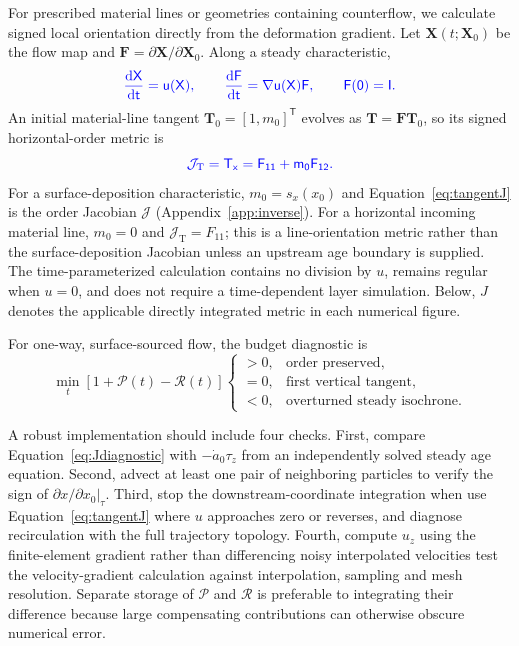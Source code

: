 \documentclass[review]{igs}
\providecommand{\DIFadd}[1]{{\protect\color{blue} \sf #1}} %
\providecommand{\DIFdel}[1]{{\protect\color{red} \scriptsize #1}} %
\providecommand{\DIFaddbegin}{} %
\providecommand{\DIFaddend}{} %
\providecommand{\DIFdelbegin}{} %
\providecommand{\DIFdelend}{} %
\newcommand{\DIFscaledelfig}{0.5}
\newlength{\DIFdelgraphicswidth} %
\newlength{\DIFdelgraphicsheight} %
\newcommand{\DIFaddincludegraphics}[2][]{{\color{blue}\fbox{\DIFOincludegraphics[#1]{#2}}}} %
\newcommand{\DIFdelincludegraphics}[2][]{%
\sbox{\DIFdelgraphicsbox}{\DIFOincludegraphics[#1]{#2}}%
\settoboxwidth{\DIFdelgraphicswidth}{\DIFdelgraphicsbox} %
\settoboxtotalheight{\DIFdelgraphicsheight}{\DIFdelgraphicsbox} %
\scalebox{\DIFscaledelfig}{%
\parbox[b]{\DIFdelgraphicswidth}{\usebox{\DIFdelgraphicsbox}\\[-\baselineskip] \rule{\DIFdelgraphicswidth}{0em}}\llap{\resizebox{\DIFdelgraphicswidth}{\DIFdelgraphicsheight}{%
\setlength{\unitlength}{\DIFdelgraphicswidth}%
\begin{picture}(1,1)%
\thicklines\linethickness{2pt} %
{\color[rgb]{1,0,0}\put(0,0){\framebox(1,1){}}}%
{\color[rgb]{1,0,0}\put(0,0){\line( 1,1){1}}}%
{\color[rgb]{1,0,0}\put(0,1){\line(1,-1){1}}}%
\end{picture}%
}\hspace*{3pt}}} %
} %
\DeclareRobustCommand{\DIFaddbegin}{\DIFOaddbegin \let\includegraphics\DIFaddincludegraphics} %
\DeclareRobustCommand{\DIFaddend}{\DIFOaddend \let\includegraphics\DIFOincludegraphics} %
\DeclareRobustCommand{\DIFdelbegin}{\DIFOdelbegin \let\includegraphics\DIFdelincludegraphics} %
\DeclareRobustCommand{\DIFdelend}{\DIFOaddend \let\includegraphics\DIFOincludegraphics} %
\begin{document}
\DIFadd{For prescribed material lines or geometries containing counterflow, we calculate signed local orientation directly from the deformation gradient. Let \(\bm{X}(t;\bm{X}_0)\) be the flow map and \(\bm{F}=\partial\bm{X}/\partial\bm{X}_0\). Along a steady characteristic,
}\begin{equation}
\DIFadd{\frac{\mathop{}\!\mathrm{d}\bm{X}}{\mathop{}\!\mathrm{d}t}=\bm{u}(\bm{X}),
\qquad
\frac{\mathop{}\!\mathrm{d}\bm{F}}{\mathop{}\!\mathrm{d}t}
=\nabla\bm{u}(\bm{X})\bm{F},
\qquad
\bm{F}(0)=\bm{I}.
\label{eq:deformationgradient}
}\end{equation}
\DIFadd{An initial material-line tangent \(\bm{T}_0=[1,m_0]^{\mathsf T}\) evolves as \(\bm{T}=\bm{F}\bm{T}_0\), so its signed horizontal-order metric is
}\begin{equation}
\DIFadd{\mathcal{J}_{\mathrm{T}}=T_x=F_{11}+m_0F_{12}.
\label{eq:tangentJ}
}\end{equation}
\DIFadd{For a surface-deposition characteristic, \(m_0=s_x(x_0)\) and Equation~\ref{eq:tangentJ} is the order Jacobian \(\mathcal{J}\) (Appendix~\ref{app:inverse}). For a horizontal incoming material line, \(m_0=0\) and \(\mathcal{J}_{\mathrm{T}}=F_{11}\); this is a line-orientation metric rather than the surface-deposition Jacobian unless an upstream age boundary is supplied. The time-parameterized calculation contains no division by \(u\), remains regular when \(u=0\), and does not require a time-dependent layer simulation. Below, \(J\) denotes the applicable directly integrated metric in each numerical figure.
}

\DIFadd{For one-way, surface-sourced flow, the budget }\DIFaddend diagnostic is
\begin{equation}
\min_t\left[1+\mathcal{P}(t)-\mathcal{R}(t)\right]
\begin{cases}
>0, & \text{order preserved},\\
=0, & \text{first vertical tangent},\\
<0, & \text{overturned steady isochrone}.
\end{cases}
\label{eq:numericaltest}
\end{equation}

A robust implementation should include four checks. First, compare Equation~\ref{eq:Jdiagnostic} with \(-\dot a_0\tau_z\) from an independently solved steady age equation. Second, advect at least one pair of neighboring particles to verify the sign of \(\partial x/\partial x_0|_{\tau}\). Third, \DIFdelbegin \DIFdel{stop the downstream-coordinate integration when }\DIFdelend \DIFaddbegin \DIFadd{use Equation~\ref{eq:tangentJ} where }\DIFaddend \(u\) approaches zero \DIFaddbegin \DIFadd{or reverses, }\DIFaddend and diagnose recirculation with the full trajectory topology. Fourth, \DIFdelbegin \DIFdel{compute \(u_z\) using the finite-element gradient rather than differencing noisy interpolated velocities}\DIFdelend \DIFaddbegin \DIFadd{test the velocity-gradient calculation against interpolation, sampling and mesh resolution}\DIFaddend . Separate storage of \(\mathcal{P}\) and \(\mathcal{R}\) is preferable to integrating their difference because large compensating contributions can otherwise obscure numerical error.
\end{document}
